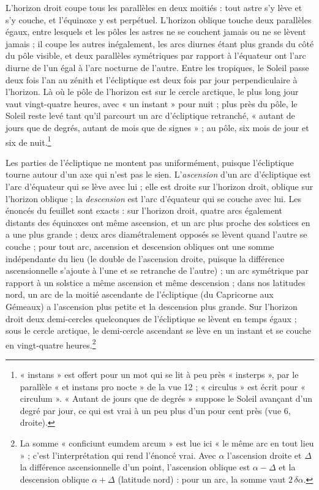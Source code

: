 \documentclass[11pt,a4paper]{article}
\begin{document}
L'horizon droit coupe tous les parallèles en deux moitiés : tout astre s'y lève
et s'y couche, et l'équinoxe y est perpétuel. L'horizon oblique touche deux
parallèles égaux, entre lesquels et les pôles les astres ne se couchent jamais
ou ne se lèvent jamais ; il coupe les autres inégalement, les arcs diurnes étant
plus grands du côté du pôle visible, et deux parallèles symétriques par rapport
à l'équateur ont l'arc diurne de l'un égal à l'arc nocturne de l'autre. Entre les
tropiques, le Soleil passe deux fois l'an au zénith et l'écliptique est deux
fois par jour perpendiculaire à l'horizon. Là où le pôle de l'horizon est sur le
cercle arctique, le plus long jour vaut vingt-quatre heures, avec « un instant »
pour nuit ; plus près du pôle, le Soleil reste levé tant qu'il parcourt un arc
d'écliptique retranché, « autant de jours que de degrés, autant de mois que de
signes » ; au pôle, six mois de jour et six de nuit.\footnote{« instans » est
offert pour un mot qui se lit à peu près « insterps », par le parallèle « et
instans pro nocte » de la vue 12 ; « circulus » est écrit pour « circulum ».
« Autant de jours que de degrés » suppose le Soleil avançant d'un degré par
jour, ce qui est vrai à un peu plus d'un pour cent près (vue 6, droite).}

Les parties de l'écliptique ne montent pas uniformément, puisque l'écliptique
tourne autour d'un axe qui n'est pas le sien. L'\emph{ascension} d'un arc
d'écliptique est l'arc d'équateur qui se lève avec lui ; elle est droite sur
l'horizon droit, oblique sur l'horizon oblique ; la \emph{descension} est
l'arc d'équateur qui se couche avec lui. Les énoncés du feuillet sont exacts :
sur l'horizon droit, quatre arcs également distants des équinoxes ont même
ascension, et un arc plus proche des solstices en a une plus grande ; deux arcs
diamétralement opposés se lèvent quand l'autre se couche ; pour tout arc,
ascension et descension obliques ont une somme indépendante du lieu (le double
de l'ascension droite, puisque la différence ascensionnelle s'ajoute à l'une et
se retranche de l'autre) ; un arc symétrique par rapport à un solstice a même
ascension et même descension ; dans nos latitudes nord, un arc de la moitié
ascendante de l'écliptique (du Capricorne aux Gémeaux) a l'ascension plus petite
et la descension plus grande. Sur l'horizon droit deux demi-cercles
quelconques de l'écliptique se lèvent en temps égaux ; sous le cercle arctique,
le demi-cercle ascendant se lève en un instant et se couche en vingt-quatre
heures.\footnote{La somme « conficiunt eumdem arcum » est lue ici « le même arc
en tout lieu » ; c'est l'interprétation qui rend l'énoncé vrai. Avec
$\alpha$ l'ascension droite et $\Delta$ la différence ascensionnelle d'un
point, l'ascension oblique est $\alpha-\Delta$ et la descension oblique
$\alpha+\Delta$ (latitude nord) : pour un arc, la somme vaut $2\,\delta\alpha$.}
\end{document}
